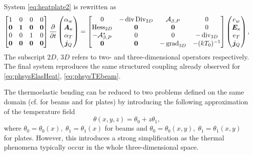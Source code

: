 System \eqref{eq:heatplate2} is rewritten as
\begin{equation}\label{eq:phsysTEplate}
\begin{bmatrix}
1 & 0 & 0 & 0\\
\bm{0} & \bm{1} & \bm{0} & \bm{0} \\
0 & 0 & 1 & 0\\
\bm{0} & \bm{0} & \bm{0} & \bm{0} \\
\end{bmatrix}
\diffp{}{t}
\begin{pmatrix}
\alpha_w \\
\bm{A}_\kappa \\
{\alpha}_T \\
\bm{j}_Q \\
\end{pmatrix} = 
\begin{bmatrix}
{0} & -\div\Div_{2D} & \mathcal{A}_{\beta, P} & {0}\\
{\Hess}_{2D} & \bm{0} & \bm{0} & {0} \\
-\mathcal{A}_{\beta, P}^* & 0 & 0 & -\div_{3D} \\
\bm{0} & \bm{0} & -\grad_{3D} & - (k T_0)^{-1} \\
\end{bmatrix}
\begin{pmatrix}
e_w \\
\bm{E}_\kappa \\
e_T \\
\bm{j}_Q \\
\end{pmatrix},
\end{equation}
The subscript $2D,\, 3D$ refers to two- and three-dimensional operators respectively. The final system reproduces the same structured coupling already observed for \eqref{eq:phsysElasHeat}, \eqref{eq:phsysTEbeam}. 

\begin{remark}
The thermoelastic bending  can be reduced to two problems defined on the same domain (cf. \cite{hansen1997boundary} for beams and \cite{avalos2000} for plates) by introducing the following approximation of the temperature field
\begin{equation}
	\theta(x,y,z) = \theta_0 + z \theta_1,
\end{equation}
where $\theta_0 = \theta_0(x), \; \theta_1 = \theta_1(x)$ for beams and $\theta_0 = \theta_0(x,y), \; \theta_1 = \theta_1(x,y)$ for plates. However, this introduces a strong simplification as the thermal phenomena typically occur in the whole three-dimensional space.
\end{remark}

